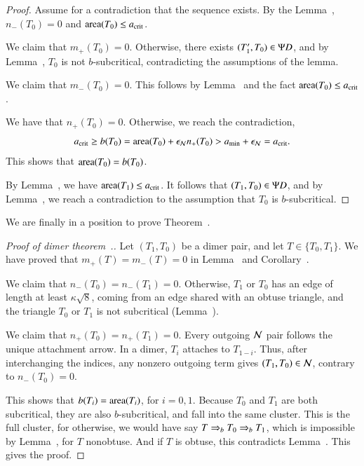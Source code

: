 \begin{proof}  
  Assume for a contradiction that the sequence exists.  By the
  Lemma~, $n_-(T_0)=0$ and ${\operatorname{area}}(T_0)\le a_\text{crit}$.

  We claim that $m_+(T_0)=0$.  Otherwise, there exists
  $(T'_1,T_0)\in\Psi D$, and by Lemma~, $T_0$ is not
  $b$-subcritical, contradicting the assumptions of the lemma.

  We claim that $m_-(T_0)=0$.  This follows by
  Lemma~ and the fact ${\operatorname{area}}(T_0)\le a_\text{crit}$.

We have that $n_+(T_0)=0$.  Otherwise, we reach the contradiction,
\[
a_\text{crit} \ge b(T_0) ={\operatorname{area}}(T_0) + \epsilon_{\mathcal N} n_+(T_0) > a_\text{min} + \epsilon_{\mathcal N} = a_\text{crit}.
\]
This shows that ${\operatorname{area}}(T_0) = b(T_0)$.

By Lemma~, we have ${\operatorname{area}}(T_1)\le a_\text{crit}$.
It follows that $(T_1,T_0)\in\Psi D$, and by Lemma~,
we reach a contradiction to the assumption that $T_0$ is $b$-subcritical. 
\end{proof}
  
We are finally in a position to prove Theorem~.

\begin{proof}[Proof of dimer theorem~.]
  Let $(T_1,T_0)$ be a dimer pair, and let $T\in \{T_0,T_1\}$.  We
  have proved that $m_+(T)=m_-(T)=0$ in Lemma~ and
  Corollary~.

  We claim that $n_-(T_0)=n_-(T_1)=0$.  Otherwise, $T_1$ or $T_0$ has
  an edge of length at least $\kappa\sqrt8$, coming from an edge
  shared with an obtuse triangle, and the triangle $T_0$ or $T_1$ is
  not subcritical (Lemma~).

  We claim that $n_+(T_0)=n_+(T_1)=0$.  Every outgoing $\mathcal N$
  pair follows the unique attachment arrow.  In a dimer, $T_i$
  attaches to $T_{1-i}$.  Thus, after interchanging the indices,
  any nonzero outgoing term gives $(T_1,T_0)\in\mathcal N$, contrary
  to $n_-(T_0)=0$.

  This shows that $b(T_i)={\operatorname{area}}(T_i)$, for $i=0,1$.  Because $T_0$ and
  $T_1$ are both subcritical, they are also $b$-subcritical, and fall
  into the same cluster.  This is the full cluster, for otherwise, we
  would have say $T\Rightarrow_{b} T_0\Rightarrow_{b} T_1$, which is impossible by
  Lemma~, for $T$ nonobtuse.  And if $T$ is
  obtuse, this contradicts Lemma~.
  This gives the proof.
\end{proof}

